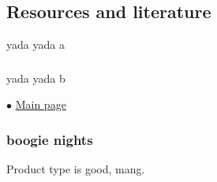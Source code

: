 
\subsection{Resources and literature} 
yada yada a

\subsubsection{\color{blue}{brainstorming}} 
yada yada b

$\bullet$ \href{https://wiki.electorama.com}{Main page}\\

{\color{blue}{
\begin{verbatim}
what is this mang
def foo(x): return 2*x
\end{verbatim}
}}%

\subsubsection{boogie nights} 
Product type is good, mang.
